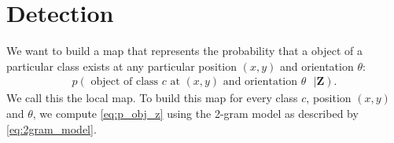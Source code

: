 \section{Detection}

We want to build a map that represents the probability that a object of a
particular class exists at any particular position $(x, y)$ and orientation
$\theta$:
%
\begin{align}
  p(\text{ object of class $c$ at $(x, y)$ and orientation $\theta$ } | \mathbf{Z})
  \text{.}
\end{align}
%
We call this the local map. To build this map for every class $c$, position $(x,
y)$ and $\theta$, we compute \eqref{eq:p_obj_z} using the 2-gram model as
described by \eqref{eq:2gram_model}.
